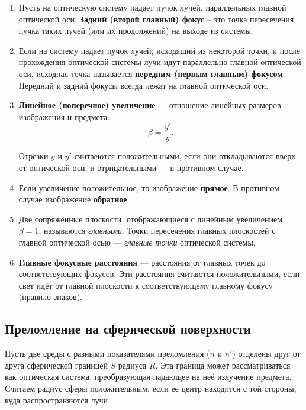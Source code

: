 \begin{enumerate}
\item{Пусть  на  оптическую  систему  падает  пучок  лучей, параллельных  главной  оптической  оси.  \textbf{Задний (второй главный) фокус} -- это точка пересечения пучка таких лучей (или их  продолжений)  на  выходе  из  системы.}

\item{Если на систему падает  пучок лучей, исходящий из некоторой  точки,  и  после  прохождения  оптической  системы  лучи  идут параллельно главной оптической оси, исходная точка называется \textbf{передним (первым главным) фокусом}. Передний и задний фокусы всегда лежат на главной оптической оси.}

\item{\textbf{Линейное (поперечное) увеличение} — отношение линейных размеров изображения и предмета:
\begin{equation}
\beta = \frac{y'}{y}.
\label{eq:lin_magn}
\end{equation} 

Отрезки $y$ и $y'$ считаеются положительными, если они откладываются вверх от оптической оси, и отрицательными — в противном случае.}

\item{Если увеличение положительное, то изображение \textbf{прямое}. В противном случае изображение \textbf{обратное}.}

\item{Две сопряжённые плоскости, отображающиеся с линейным увеличением $\beta = 1$, называются \textit{главными}. Точки пересечения главных плоскостей с главной оптической осью — \textit{главные точки} оптической системы.}

\item{\textbf{Главные фокусные расстояния} — расстояния от главных точек до соответствующих фокусов. Эти расстояния считаются положительными, если свет идёт от главной плоскости к соответствующему главному фокусу (правило знаков).}


\end{enumerate}

\subsection{Преломление на сферической поверхности}
 
Пусть две среды с разными показателями преломления ($n$ и $n'$) отделены друг от друга сферической границей $S$ радиуса $R$. Эта граница может рассматриваться как оптическая система, преобразующая падающее на неё излучение предмета. Считаем радиус сферы положительным, если её центр находится с той стороны, куда распространяются лучи.


